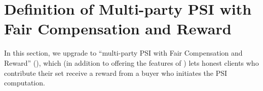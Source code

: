 



 \vspace{-2mm}

\section{Definition of Multi-party PSI with Fair Compensation and Reward}


In this section, we upgrade \p to ``multi-party PSI with Fair Compensation and Reward'' (\ep), which (in addition to offering the features of \p) lets honest clients who contribute their set receive a reward from a buyer who initiates the PSI computation. %





%  


